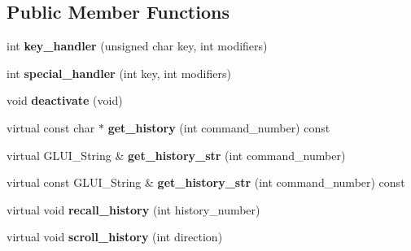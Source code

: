 \subsection*{Public Member Functions}
\begin{DoxyCompactItemize}
\item 
\hypertarget{classGLUI__CommandLine_aac74b2f165792141d6665de1690d0aa4}{int {\bfseries key\-\_\-handler} (unsigned char key, int modifiers)}\label{classGLUI__CommandLine_aac74b2f165792141d6665de1690d0aa4}

\item 
\hypertarget{classGLUI__CommandLine_a88dafdb294350ff13c68973b59c308d1}{int {\bfseries special\-\_\-handler} (int key, int modifiers)}\label{classGLUI__CommandLine_a88dafdb294350ff13c68973b59c308d1}

\item 
\hypertarget{classGLUI__CommandLine_a827fe6510aa5a38b0d2c5d016a93e1ba}{void {\bfseries deactivate} (void)}\label{classGLUI__CommandLine_a827fe6510aa5a38b0d2c5d016a93e1ba}

\item 
\hypertarget{classGLUI__CommandLine_a565145da6c84b9f925ca30735fc27686}{virtual const char $\ast$ {\bfseries get\-\_\-history} (int command\-\_\-number) const }\label{classGLUI__CommandLine_a565145da6c84b9f925ca30735fc27686}

\item 
\hypertarget{classGLUI__CommandLine_a43403d60b3ac8534b84393c5328b7a03}{virtual G\-L\-U\-I\-\_\-\-String \& {\bfseries get\-\_\-history\-\_\-str} (int command\-\_\-number)}\label{classGLUI__CommandLine_a43403d60b3ac8534b84393c5328b7a03}

\item 
\hypertarget{classGLUI__CommandLine_a9365735c17057bea2039db66d8df67f3}{virtual const G\-L\-U\-I\-\_\-\-String \& {\bfseries get\-\_\-history\-\_\-str} (int command\-\_\-number) const }\label{classGLUI__CommandLine_a9365735c17057bea2039db66d8df67f3}

\item 
\hypertarget{classGLUI__CommandLine_a24c54c2606a9f0352fe427f84fa4b2f2}{virtual void {\bfseries recall\-\_\-history} (int history\-\_\-number)}\label{classGLUI__CommandLine_a24c54c2606a9f0352fe427f84fa4b2f2}

\item 
\hypertarget{classGLUI__CommandLine_a0396c90a0adb828dd8c4ba294873494d}{virtual void {\bfseries scroll\-\_\-history} (int direction)}\label{classGLUI__CommandLine_a0396c90a0adb828dd8c4ba294873494d}


\end{DoxyCompactItemize}
